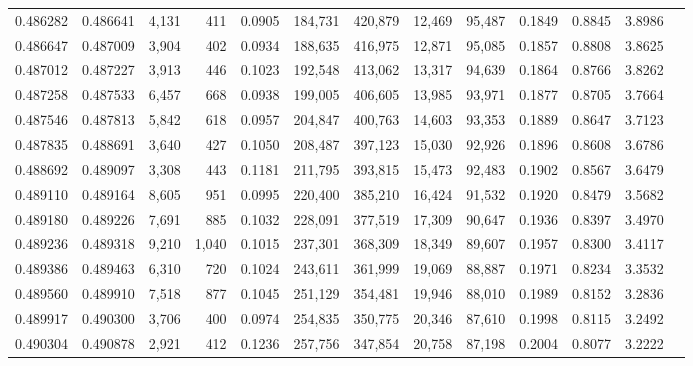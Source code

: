 \begin{tabular}{rrrrrrrrrrrrr}
0.486282 & 0.486641 &  4,131 &   411 &                                     0.0905 & 184,731 & 420,879 &  12,469 &  95,487 & 0.1849 & 0.8845 & 3.8986 \\
0.486647 & 0.487009 &  3,904 &   402 &                                     0.0934 & 188,635 & 416,975 &  12,871 &  95,085 & 0.1857 & 0.8808 & 3.8625 \\
0.487012 & 0.487227 &  3,913 &   446 &                                     0.1023 & 192,548 & 413,062 &  13,317 &  94,639 & 0.1864 & 0.8766 & 3.8262 \\
0.487258 & 0.487533 &  6,457 &   668 &                                     0.0938 & 199,005 & 406,605 &  13,985 &  93,971 & 0.1877 & 0.8705 & 3.7664 \\
0.487546 & 0.487813 &  5,842 &   618 &                                     0.0957 & 204,847 & 400,763 &  14,603 &  93,353 & 0.1889 & 0.8647 & 3.7123 \\
0.487835 & 0.488691 &  3,640 &   427 &                                     0.1050 & 208,487 & 397,123 &  15,030 &  92,926 & 0.1896 & 0.8608 & 3.6786 \\
0.488692 & 0.489097 &  3,308 &   443 &                                     0.1181 & 211,795 & 393,815 &  15,473 &  92,483 & 0.1902 & 0.8567 & 3.6479 \\
0.489110 & 0.489164 &  8,605 &   951 &                                     0.0995 & 220,400 & 385,210 &  16,424 &  91,532 & 0.1920 & 0.8479 & 3.5682 \\
0.489180 & 0.489226 &  7,691 &   885 &                                     0.1032 & 228,091 & 377,519 &  17,309 &  90,647 & 0.1936 & 0.8397 & 3.4970 \\
0.489236 & 0.489318 &  9,210 & 1,040 &                                     0.1015 & 237,301 & 368,309 &  18,349 &  89,607 & 0.1957 & 0.8300 & 3.4117 \\
0.489386 & 0.489463 &  6,310 &   720 &                                     0.1024 & 243,611 & 361,999 &  19,069 &  88,887 & 0.1971 & 0.8234 & 3.3532 \\
0.489560 & 0.489910 &  7,518 &   877 &                                     0.1045 & 251,129 & 354,481 &  19,946 &  88,010 & 0.1989 & 0.8152 & 3.2836 \\
0.489917 & 0.490300 &  3,706 &   400 &                                     0.0974 & 254,835 & 350,775 &  20,346 &  87,610 & 0.1998 & 0.8115 & 3.2492 \\
0.490304 & 0.490878 &  2,921 &   412 &                                     0.1236 & 257,756 & 347,854 &  20,758 &  87,198 & 0.2004 & 0.8077 & 3.2222 \\

\end{tabular}
